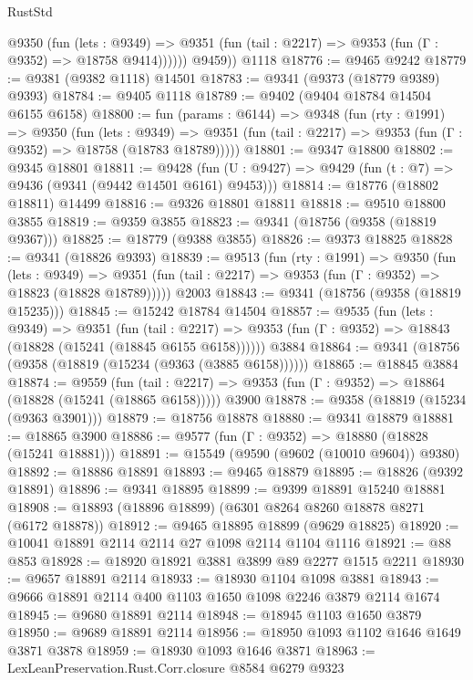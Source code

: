 \begin{lexlean}{RustStd}
\begin{coremodule}
            @9350
              (fun (lets : @9349) =>
              @9351 (fun (tail : @2217) => @9353 (fun (Γ : @9352) => @18758 @9414))))))
        @9459))
    @1118
@18776 := @9465 @9242
@18779 := @9381 (@9382 @1118) @14501
@18783 := @9341 (@9373 (@18779 @9389) @9393)
@18784 := @9405 @1118
@18789 := @9402 (@9404 @18784 @14504 @6155 @6158)
@18800 := fun (params : @6144) =>
  @9348
    (fun (rty : @1991) =>
    @9350
      (fun (lets : @9349) =>
      @9351 (fun (tail : @2217) => @9353 (fun (Γ : @9352) => @18758 (@18783 @18789)))))
@18801 := @9347 @18800
@18802 := @9345 @18801
@18811 := @9428
    (fun (U : @9427) => @9429 (fun (t : @7) => @9436 (@9341 (@9442 @14501 @6161) @9453)))
@18814 := @18776 (@18802 @18811) @14499
@18816 := @9326 @18801 @18811
@18818 := @9510 @18800 @3855
@18819 := @9359 @3855
@18823 := @9341 (@18756 (@9358 (@18819 @9367)))
@18825 := @18779 (@9388 @3855)
@18826 := @9373 @18825
@18828 := @9341 (@18826 @9393)
@18839 := @9513
    (fun (rty : @1991) =>
    @9350
      (fun (lets : @9349) =>
      @9351 (fun (tail : @2217) => @9353 (fun (Γ : @9352) => @18823 (@18828 @18789)))))
    @2003
@18843 := @9341 (@18756 (@9358 (@18819 @15235)))
@18845 := @15242 @18784 @14504
@18857 := @9535
    (fun (lets : @9349) =>
    @9351
      (fun (tail : @2217) =>
      @9353 (fun (Γ : @9352) => @18843 (@18828 (@15241 (@18845 @6155 @6158))))))
    @3884
@18864 := @9341 (@18756 (@9358 (@18819 (@15234 (@9363 (@3885 @6158))))))
@18865 := @18845 @3884
@18874 := @9559
    (fun (tail : @2217) => @9353 (fun (Γ : @9352) => @18864 (@18828 (@15241 (@18865 @6158)))))
    @3900
@18878 := @9358 (@18819 (@15234 (@9363 @3901)))
@18879 := @18756 @18878
@18880 := @9341 @18879
@18881 := @18865 @3900
@18886 := @9577 (fun (Γ : @9352) => @18880 (@18828 (@15241 @18881)))
@18891 := @15549 (@9590 (@9602 (@10010 @9604)) @9380)
@18892 := @18886 @18891
@18893 := @9465 @18879
@18895 := @18826 (@9392 @18891)
@18896 := @9341 @18895
@18899 := @9399 @18891 @15240 @18881
@18908 := @18893 (@18896 @18899) (@6301 @8264 @8260 @18878 @8271 (@6172 @18878))
@18912 := @9465 @18895 @18899 (@9629 @18825)
@18920 := @10041 @18891 @2114 @2114 @27 @1098 @2114 @1104 @1116
@18921 := @88 @853
@18928 := @18920 @18921 @3881 @3899 @89 @2277 @1515 @2211
@18930 := @9657 @18891 @2114
@18933 := @18930 @1104 @1098 @3881
@18943 := @9666 @18891 @2114 @400 @1103 @1650 @1098 @2246 @3879 @2114 @1674
@18945 := @9680 @18891 @2114
@18948 := @18945 @1103 @1650 @3879
@18950 := @9689 @18891 @2114
@18956 := @18950 @1093 @1102 @1646 @1649 @3871 @3878
@18959 := @18930 @1093 @1646 @3871
@18963 := LexLeanPreservation.Rust.Corr.closure @8584 @6279 @9323

\end{coremodule}
\end{lexlean}
